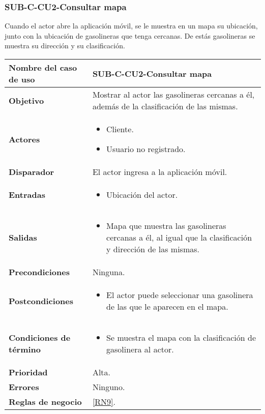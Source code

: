 \subsubsection{SUB-C-CU2-Consultar mapa}\label{SUB-C-CU2}
Cuando el actor abre la aplicación móvil, se le muestra en un mapa su ubicación, junto con la ubicación de gasolineras que tenga cercanas. De estás gasolineras se muestra su dirección y su clasificación.

\begin{longtable}{|J{5cm}|J{10.3cm}|}
	\hline
	\textbf{Nombre del caso de uso} &
		SUB-C-CU2-Consultar mapa \\ \hline
	\textbf{Objetivo} &
		Mostrar al actor las gasolineras cercanas a él, además de la clasificación de las mismas. \\ \hline
	\textbf{Actores} &
		\begin{itemize}
			\item Cliente.
			\item Usuario no registrado.
		\end{itemize}
		 \\ \hline 
	\textbf{Disparador} & 
		El actor ingresa a la aplicación móvil. \\ \hline
	\textbf{Entradas} & 
		\begin{itemize}
				\item Ubicación del actor.
		\end{itemize}\\ \hline 
	\textbf{Salidas} & 
		\begin{itemize}
			\item Mapa que muestra las gasolineras cercanas a él, al igual que la clasificación y dirección de las mismas.
		\end{itemize} \\ \hline
	\textbf{Precondiciones} &
		Ninguna.\\ \hline
	\textbf{Postcondiciones} &
		\begin{itemize}
			\item El actor puede seleccionar una gasolinera de las que le aparecen en el mapa.
		\end{itemize} \\ \hline
	\textbf{Condiciones de término} & 
		\begin{itemize}
			\item Se muestra el mapa con la clasificación de gasolinera al actor.
		\end{itemize} \\ \hline 
	\textbf{Prioridad} & 
		Alta. \\ \hline
	\textbf{Errores} & Ninguno.
		\\ \hline
	\textbf{Reglas de negocio} & \ref{RN9}.
		 \\ \hline
\end{longtable}

